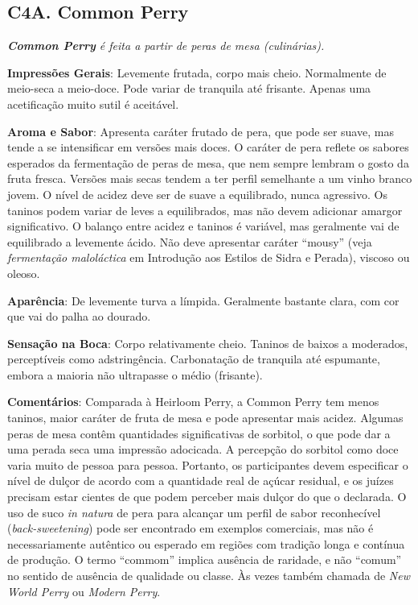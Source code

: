 \subsection*{C4A. Common Perry}

\textit{\textbf{Common Perry} é feita a partir de peras de mesa (culinárias).}

\textbf{Impressões Gerais}: Levemente frutada, corpo mais cheio. Normalmente de meio-seca a meio-doce. Pode variar de tranquila até frisante. Apenas uma acetificação muito sutil é aceitável.

\textbf{Aroma e Sabor}: Apresenta caráter frutado de pera, que pode ser suave, mas tende a se intensificar em versões mais doces. O caráter de pera reflete os sabores esperados da fermentação de peras de mesa, que nem sempre lembram o gosto da fruta fresca. Versões mais secas tendem a ter perfil semelhante a um vinho branco jovem. O nível de acidez deve ser de suave a equilibrado, nunca agressivo. Os taninos podem variar de leves a equilibrados, mas não devem adicionar amargor significativo. O balanço entre acidez e taninos é variável, mas geralmente vai de equilibrado a levemente ácido. Não deve apresentar caráter “mousy” (veja \textit{fermentação maloláctica} em Introdução aos Estilos de Sidra e Perada), viscoso ou oleoso.

\textbf{Aparência}: De levemente turva a límpida. Geralmente bastante clara, com cor que vai do palha ao dourado.

\textbf{Sensação na Boca}: Corpo relativamente cheio. Taninos de baixos a moderados, perceptíveis como adstringência. Carbonatação de tranquila até espumante, embora a maioria não ultrapasse o médio (frisante).

\textbf{Comentários}: Comparada à Heirloom Perry, a Common Perry tem menos taninos, maior caráter de fruta de mesa e pode apresentar mais acidez. Algumas peras de mesa contêm quantidades significativas de sorbitol, o que pode dar a uma perada seca uma impressão adocicada. A percepção do sorbitol como doce varia muito de pessoa para pessoa. Portanto, os participantes devem especificar o nível de dulçor de acordo com a quantidade real de açúcar residual, e os juízes precisam estar cientes de que podem perceber mais dulçor do que o declarada. O uso de suco \textit{in natura} de pera para alcançar um perfil de sabor reconhecível (\textit{back-sweetening}) pode ser encontrado em exemplos comerciais, mas não é necessariamente autêntico ou esperado em regiões com tradição longa e contínua de produção. O termo “commom” implica ausência de raridade, e não “comum” no sentido de ausência de qualidade ou classe. Às vezes também chamada de \textit{New World Perry} ou \textit{Modern Perry}.

